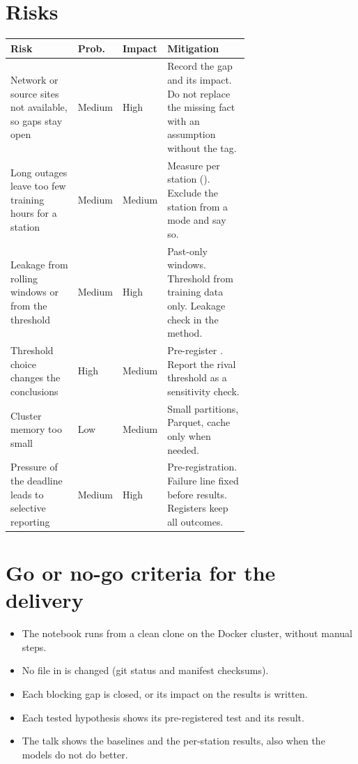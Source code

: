 \documentclass[11pt]{article}
\begin{document}
\section{Risks}
\small
\begin{longtable}{@{}P{0.3\linewidth} l l P{0.38\linewidth}@{}}
\toprule
\textbf{Risk} & \textbf{Prob.} & \textbf{Impact} & \textbf{Mitigation} \\
\midrule\endhead
\bottomrule\endfoot
Network or source sites not available, so gaps stay open & Medium & High & Record the gap and its impact. Do not replace the missing fact with an assumption without the tag. \\
Long outages leave too few training hours for a station & Medium & Medium & Measure per station (). Exclude the station from a mode and say so. \\
Leakage from rolling windows or from the threshold & Medium & High & Past-only windows. Threshold from training data only. Leakage check in the method. \\
Threshold choice changes the conclusions & High & Medium & Pre-register . Report the rival threshold as a sensitivity check. \\
Cluster memory too small & Low & Medium & Small partitions, Parquet, cache only when needed. \\
Pressure of the deadline leads to selective reporting & Medium & High & Pre-registration. Failure line fixed before results. Registers keep all outcomes. \\
\end{longtable}
\normalsize

\section{Go or no-go criteria for the delivery}
\begin{itemize}
  \item The notebook runs from a clean clone on the Docker cluster, without manual steps.
  \item No file in  is changed (git status and manifest checksums).
  \item Each blocking gap is closed, or its impact on the results is written.
  \item Each tested hypothesis shows its pre-registered test and its result.
  \item The talk shows the baselines and the per-station results, also when the models do not do better.
\end{itemize}
\end{document}
